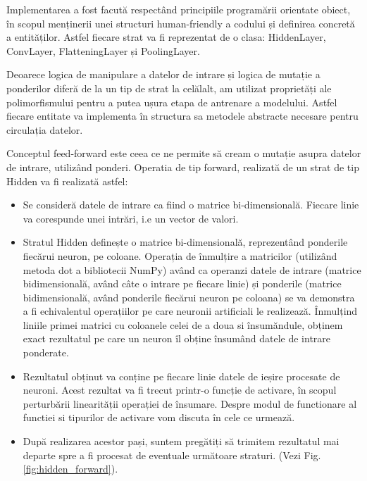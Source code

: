	Implementarea a fost facută respectând principiile programării orientate obiect, în scopul menținerii unei structuri human-friendly a codului și definirea concretă a entităților. Astfel fiecare strat va fi reprezentat de o clasa: HiddenLayer, ConvLayer, FlatteningLayer și PoolingLayer. 
	
	Deoarece logica de manipulare a datelor de intrare și logica de mutație a ponderilor diferă de la un tip de strat la celălalt, am utilizat proprietăți ale polimorfismului pentru a putea ușura etapa de antrenare a modelului. Astfel fiecare entitate va implementa în structura sa metodele abstracte necesare pentru circulația datelor. 
	
	Conceptul feed-forward este ceea ce ne permite să cream o mutație asupra datelor de intrare, utilizând ponderi. 
	Operatia de tip forward, realizată de un strat de tip Hidden va fi realizată astfel: 
	
	\begin{itemize}
	\item	Se consideră datele de intrare ca fiind o matrice bi-dimensională. Fiecare linie va corespunde unei intrări, i.e un vector de valori.
	
	\item	Stratul Hidden definește o matrice bi-dimensională, reprezentând ponderile fiecărui neuron, pe coloane. Operația de înmulțire a matricilor (utilizând metoda dot a bibliotecii NumPy) având ca operanzi datele de intrare (matrice bidimensională, având câte o intrare pe fiecare linie) și ponderile (matrice bidimensională, având ponderile fiecărui neuron pe coloana) se va demonstra a fi echivalentul operațiilor pe care neuronii artificiali le realizează.  Înmulțind liniile primei matrici cu coloanele celei de a doua si însumăndule, obținem exact rezultatul pe care un neuron îl obține însumând datele de intrare ponderate. 
	
	
	\item	Rezultatul obținut va conține pe fiecare linie datele de ieșire procesate de neuroni. Acest rezultat va fi trecut printr-o funcție de activare, în scopul perturbării linearității operației de însumare. Despre modul de functionare al functiei si tipurilor de activare vom discuta în cele ce urmează.
	
	\item	După realizarea acestor pași, suntem pregătiți să trimitem rezultatul mai departe spre a fi procesat de eventuale următoare straturi. (Vezi Fig. \ref{fig:hidden_forward}).
	\end{itemize}

